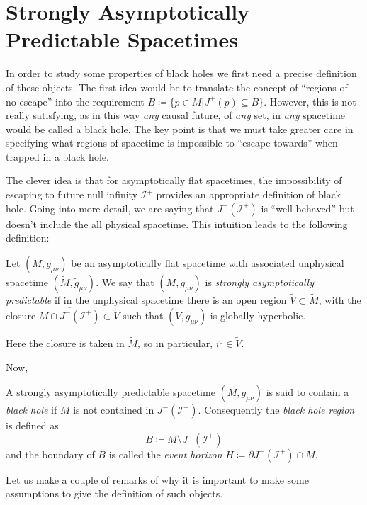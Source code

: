 \section{Strongly Asymptotically Predictable Spacetimes}
In order to study some properties of black holes we first need a precise definition of these objects. The first idea would be to translate the concept of ``regions of no-escape'' into the requirement \(B \coloneqq \{p \in M\vert J^+(p)\subseteq B \}\).
However, this is not really satisfying, as in this way \emph{any} causal future, of \emph{any} set, in \emph{any} spacetime would be called a black hole. The key point is that we must take greater care in specifying what regions of spacetime is impossible to ``escape towards'' when trapped in a black hole.

The clever idea is that for asymptotically flat spacetimes, the impossibility of escaping to future null infinity \(\mathscr{I}^+\) provides an appropriate definition of black hole. Going into more detail, we are saying that \(J^-(\mathscr{I}^+)\) is ``well behaved'' but doesn't include the all physical spacetime. This intuition leads to the following definition:
\begin{definition}
	Let \((M, g_{\mu\nu})\) be an asymptotically flat spacetime with associated unphysical spacetime \((\tilde{M}, \tilde{g}_{\mu\nu})\). We say that \((M, g_{\mu\nu})\)  is \emph{strongly asymptotically predictable} if in the unphysical spacetime there is an open region \(\tilde{V} \subset \tilde{M}\), with the closure \(\overline{M \cap J^-(\mathscr{I}^+)}\subset \tilde{V}\) such that \((\tilde{V}, \tilde{g}_{\mu\nu})\) is globally hyperbolic.
\end{definition}

\begin{remark}
	Here the closure is taken in \(\tilde{M}\), so in particular, \(i^0 \in \tilde{V}\). 
\end{remark}

Now,
\begin{definition}
	A strongly asymptotically predictable spacetime \((M, g_{\mu\nu})\) is said to contain a \emph{black hole} if \(M\) is not contained in \(J^-(\mathscr{I}^+)\). Consequently the \emph{black hole region} is defined as 
	\[
	B \coloneqq M \setminus J^-(\mathscr{I}^+)
	\]
	and the boundary of \(B\) is called the \emph{event horizon} \(H\coloneqq \partial J^-(\mathscr{I}^+) \cap M \).
\end{definition}

Let us make a couple of remarks of why it is important to make some assumptions to give the definition of such objects.

